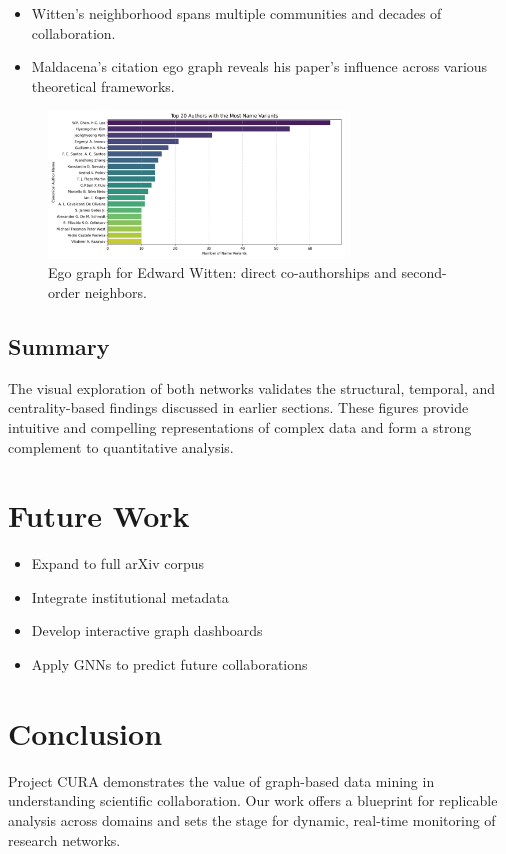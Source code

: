 \documentclass[12pt]{article}
\begin{document}
\begin{itemize}
    \item Witten’s neighborhood spans multiple communities and decades of collaboration.
    \item Maldacena’s citation ego graph reveals his paper’s influence across various theoretical frameworks.
\end{itemize}

\begin{figure}[H]
    \centering
    \includegraphics[width=0.7\textwidth]{pictures/top_author_name_variants.png}
    \caption{Ego graph for Edward Witten: direct co-authorships and second-order neighbors.}
\end{figure}

\subsection{Summary}
The visual exploration of both networks validates the structural, temporal, and centrality-based findings discussed in earlier sections. These figures provide intuitive and compelling representations of complex data and form a strong complement to quantitative analysis.


\section{Future Work}
\begin{itemize}
\item Expand to full arXiv corpus
\item Integrate institutional metadata
\item Develop interactive graph dashboards
\item Apply GNNs to predict future collaborations
\end{itemize}

\section{Conclusion}
Project CURA demonstrates the value of graph-based data mining in understanding scientific collaboration. Our work offers a blueprint for replicable analysis across domains and sets the stage for dynamic, real-time monitoring of research networks.
\end{document}
